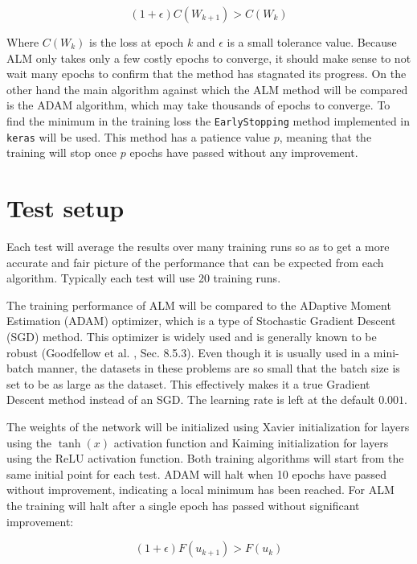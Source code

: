 \begin{equation}
(1+\epsilon)C(W_{k+1}) > C(W_k)
\end{equation}

Where $C(W_k)$ is the loss at epoch $k$ and $\epsilon$ is a small tolerance value. Because ALM only takes only a few costly epochs to converge, it should make sense to not wait many epochs to confirm that the method has stagnated its progress. On the other hand the main algorithm against which the ALM method will be compared is the ADAM algorithm, which may take thousands of epochs to converge. To find the minimum in the training loss the \texttt{EarlyStopping} method implemented in \texttt{keras} will be used. This method has a patience value $p$, meaning that the training will stop once $p$ epochs have passed without any improvement.
 

\section{Test setup}
Each test will average the results over many training runs so as to get a more accurate and fair picture of the performance that can be expected from each algorithm. Typically each test will use 20 training runs.

The training performance of ALM will be compared to the ADaptive Moment Estimation (ADAM) optimizer, which is a type of Stochastic Gradient Descent (SGD) method. This optimizer is widely used and is generally known to be robust (Goodfellow et al. \cite{Goodfellow-et-al-2016}, Sec. 8.5.3). Even though it is usually used in a mini-batch manner, the datasets in these problems are so small that the batch size is set to be as large as the dataset. This effectively makes it a true Gradient Descent method instead of an SGD. The learning rate is left at the default $0.001$. 

The weights of the network will be initialized using Xavier initialization for layers using the $\tanh(x)$ activation function and Kaiming initialization for layers using the ReLU activation function. Both training algorithms will start from the same initial point for each test. ADAM will halt when 10 epochs have passed without improvement, indicating a local minimum has been reached. For ALM the training will halt after a single epoch has passed without significant improvement:

\begin{equation}
(1+\epsilon)F(u_{k+1}) > F(u_k)
\end{equation}

